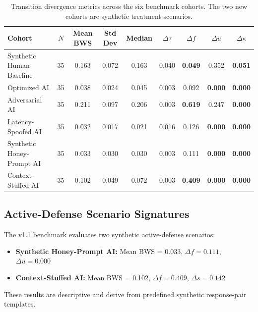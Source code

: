 \documentclass[10pt,a4paper]{article}
\begin{document}
\begin{table}[h!]
\centering
\small
\begin{tabular}{lcccccccc}
\toprule
\textbf{Cohort} & \textbf{$N$} & \textbf{Mean BWS} & \textbf{Std Dev} & \textbf{Median} & \textbf{$\Delta \tau$} & \textbf{$\Delta f$} & \textbf{$\Delta u$} & \textbf{$\Delta \kappa$} \\
\midrule
Synthetic Human Baseline & 35 & 0.163 & 0.072 & 0.163 & 0.040 & \textbf{0.049} & 0.352 & \textbf{0.051} \\
Optimized AI & 35 & 0.038 & 0.024 & 0.045 & 0.003 & 0.092 & \textbf{0.000} & \textbf{0.000} \\
Adversarial AI & 35 & 0.211 & 0.097 & 0.206 & 0.003 & \textbf{0.619} & 0.247 & \textbf{0.000} \\
Latency-Spoofed AI & 35 & 0.032 & 0.017 & 0.021 & 0.016 & 0.126 & \textbf{0.000} & \textbf{0.000} \\
Synthetic Honey-Prompt AI & 35 & 0.033 & 0.030 & 0.030 & 0.003 & 0.111 & \textbf{0.000} & \textbf{0.000} \\
Context-Stuffed AI & 35 & 0.102 & 0.049 & 0.072 & 0.003 & \textbf{0.409} & \textbf{0.000} & \textbf{0.000} \\
\bottomrule
\end{tabular}
\caption{Transition divergence metrics across the six benchmark cohorts. The two new cohorts are synthetic treatment scenarios.}
\label{tab:results}
\end{table}

\subsection*{Active-Defense Scenario Signatures}
The v1.1 benchmark evaluates two synthetic active-defense scenarios:
\begin{itemize}
    \item \textbf{Synthetic Honey-Prompt AI:} Mean BWS = 0.033, $\Delta f = 0.111$, $\Delta u = 0.000$
    \item \textbf{Context-Stuffed AI:} Mean BWS = 0.102, $\Delta f = 0.409$, $\Delta s = 0.142$
\end{itemize}
These results are descriptive and derive from predefined synthetic response-pair templates.
\end{document}
